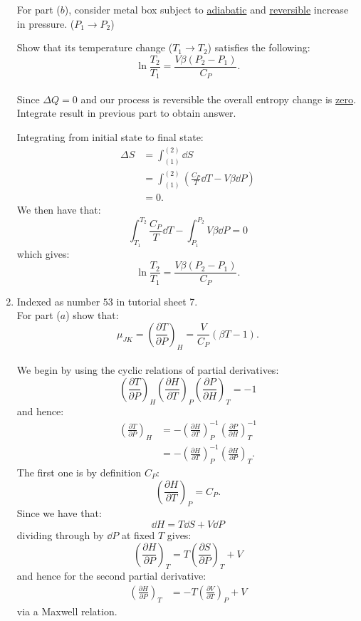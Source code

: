 \begin{enumerate}
    For part ($b$), consider metal box subject to \underline{adiabatic} and \underline{reversible} increase in pressure. ($P_1\rightarrow P_2$)

    Show that its temperature change ($T_1\rightarrow T_2$)
    satisfies the following:
    $$\ln\frac{T_2}{T_1}=\frac{V\beta(P_2-P_1)}{C_P}.$$ \\

    Since $\Delta Q=0$ and our process is reversible the overall entropy change is \underline{zero}. Integrate result in previous part to obtain answer.

    \newpage

    Integrating from initial state to final state:
    \begin{align*}
        \Delta S
        &=\int_{(1)}^{(2)}\dd S \\
        &=\int_{(1)}^{(2)}
        \left(\frac{C_P}{T}\dd T -V\beta\dd P\right) \\
        &=0.
    \end{align*}
    We then have that:
    $$\int_{T_1}^{T_2}\frac{C_P}{T}\dd T
    -\int_{P_1}^{P_2}V\beta\dd P=0$$
    which gives:
    $$\ln\frac{T_2}{T_1}=\frac{V\beta(P_2-P_1)}{C_P}.$$

    \newpage

    \item Indexed as number $53$ in tutorial sheet 7. \\

    For part ($a$) show that:
    $$\mu_{JK}=\left(\frac{\partial T}{\partial P}\right)_H
    =\frac{V}{C_P}(\beta T-1).$$ \\

    We begin by using the cyclic relations of partial derivatives:
    $$\left(\frac{\partial T}{\partial P}\right)_H
    \left(\frac{\partial H}{\partial T}\right)_P
    \left(\frac{\partial P}{\partial H}\right)_T=-1$$
    and hence:
    \begin{align*}
        \left(\frac{\partial T}{\partial P}\right)_H
        &=-\left(\frac{\partial H}{\partial T}\right)_P^{-1}
        \left(\frac{\partial P}{\partial H}\right)_T^{-1} \\
        &=-\left(\frac{\partial H}{\partial T}\right)_P^{-1}
        \left(\frac{\partial H}{\partial P}\right)_T.
    \end{align*}
    The first one is by definition $C_P$:
    $$\left(\frac{\partial H}{\partial T}\right)_P
    =C_P.$$
    Since we have that:
    $$\dd H=T\dd S+V\dd P$$
    dividing through by $\dd P$ at fixed $T$ gives:
    $$\left(\frac{\partial H}{\partial P}\right)_T
    =T\left(\frac{\partial S}{\partial P}\right)_T+V$$
    and hence for the second partial derivative:
    \begin{align*}
        \left(\frac{\partial H}{\partial P}\right)_T
        &=-T\left(\frac{\partial V}{\partial T}\right)_P+V
    \end{align*}
    via a Maxwell relation. \\


\end{enumerate}
